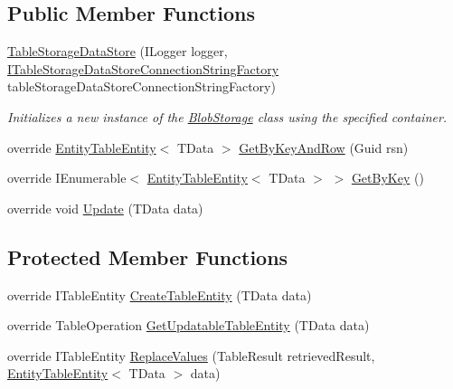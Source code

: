 \subsection*{Public Member Functions}
\begin{DoxyCompactItemize}
\item 
\hyperlink{classCqrs_1_1Azure_1_1Storage_1_1DataStores_1_1TableStorageDataStore_a25a32a83c14eb5068f5bc9bcacfa15f6_a25a32a83c14eb5068f5bc9bcacfa15f6}{Table\+Storage\+Data\+Store} (I\+Logger logger, \hyperlink{interfaceCqrs_1_1Azure_1_1BlobStorage_1_1DataStores_1_1ITableStorageDataStoreConnectionStringFactory}{I\+Table\+Storage\+Data\+Store\+Connection\+String\+Factory} table\+Storage\+Data\+Store\+Connection\+String\+Factory)
\begin{DoxyCompactList}\small\item\em Initializes a new instance of the \hyperlink{namespaceCqrs_1_1Azure_1_1BlobStorage}{Blob\+Storage} class using the specified container. \end{DoxyCompactList}\item 
override \hyperlink{classCqrs_1_1Azure_1_1BlobStorage_1_1EntityTableEntity}{Entity\+Table\+Entity}$<$ T\+Data $>$ \hyperlink{classCqrs_1_1Azure_1_1Storage_1_1DataStores_1_1TableStorageDataStore_a61e3fc6404283606ec41a5e5a3c72ac8_a61e3fc6404283606ec41a5e5a3c72ac8}{Get\+By\+Key\+And\+Row} (Guid rsn)
\item 
override I\+Enumerable$<$ \hyperlink{classCqrs_1_1Azure_1_1BlobStorage_1_1EntityTableEntity}{Entity\+Table\+Entity}$<$ T\+Data $>$ $>$ \hyperlink{classCqrs_1_1Azure_1_1Storage_1_1DataStores_1_1TableStorageDataStore_a79043a9d497f4027cf87e5ff78fe6098_a79043a9d497f4027cf87e5ff78fe6098}{Get\+By\+Key} ()
\item 
override void \hyperlink{classCqrs_1_1Azure_1_1Storage_1_1DataStores_1_1TableStorageDataStore_a9afab2cca66ca4453b2ab56916578c7d_a9afab2cca66ca4453b2ab56916578c7d}{Update} (T\+Data data)
\end{DoxyCompactItemize}
\subsection*{Protected Member Functions}
\begin{DoxyCompactItemize}
\item 
override I\+Table\+Entity \hyperlink{classCqrs_1_1Azure_1_1Storage_1_1DataStores_1_1TableStorageDataStore_abf8e295af6e0925f1c9c3550b931a4a8_abf8e295af6e0925f1c9c3550b931a4a8}{Create\+Table\+Entity} (T\+Data data)
\item 
override Table\+Operation \hyperlink{classCqrs_1_1Azure_1_1Storage_1_1DataStores_1_1TableStorageDataStore_a54f00f53521e285568f19c29527d6466_a54f00f53521e285568f19c29527d6466}{Get\+Updatable\+Table\+Entity} (T\+Data data)
\item 
override I\+Table\+Entity \hyperlink{classCqrs_1_1Azure_1_1Storage_1_1DataStores_1_1TableStorageDataStore_ae9aeb3daf2648a03db25f2a3ddfd87ee_ae9aeb3daf2648a03db25f2a3ddfd87ee}{Replace\+Values} (Table\+Result retrieved\+Result, \hyperlink{classCqrs_1_1Azure_1_1BlobStorage_1_1EntityTableEntity}{Entity\+Table\+Entity}$<$ T\+Data $>$ data)
\end{DoxyCompactItemize}
